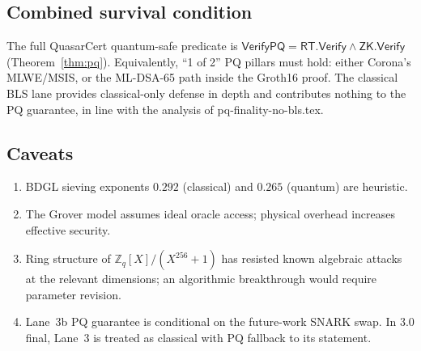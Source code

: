 \documentclass[11pt]{article}
\begin{document}
\subsection{Combined survival condition}

The full QuasarCert quantum-safe predicate is
$\mathsf{VerifyPQ} = \mathsf{RT.Verify} \land \mathsf{ZK.Verify}$
(Theorem~\ref{thm:pq}).  Equivalently, ``1 of 2'' PQ pillars must hold:
either Corona's MLWE/MSIS, or the ML-DSA-65 path inside the Groth16
proof.  The classical BLS lane provides classical-only defense in
depth and contributes nothing to the PQ guarantee, in line with the
analysis of pq-finality-no-bls.tex.

\subsection{Caveats}

\begin{enumerate}[nosep]
  \item BDGL sieving exponents $0.292$ (classical) and $0.265$
    (quantum) are heuristic.
  \item The Grover model assumes ideal oracle access; physical
    overhead increases effective security.
  \item Ring structure of $\mathbb{Z}_q[X]/(X^{256}+1)$ has resisted
    known algebraic attacks at the relevant dimensions; an algorithmic
    breakthrough would require parameter revision.
  \item Lane~3b PQ guarantee is conditional on the future-work SNARK
    swap.  In 3.0 final, Lane~3 is treated as classical with PQ
    fallback to its statement.
\end{enumerate}
\end{document}

